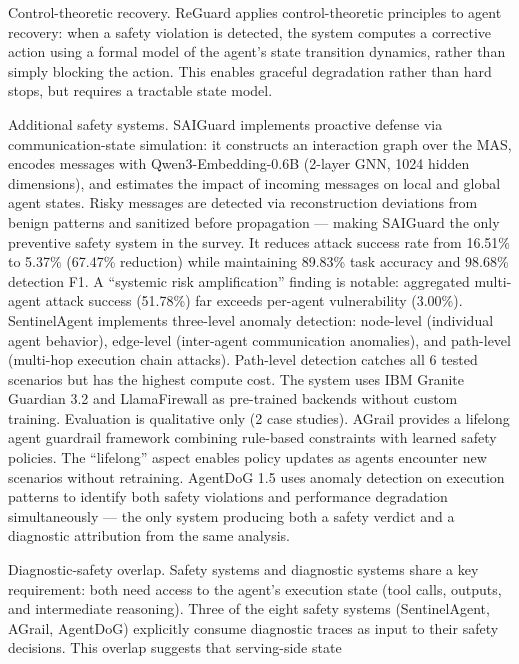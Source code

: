 \documentclass[preprint,12pt]{elsarticle}
\begin{document}
Control-theoretic recovery. ReGuard \cite{v5ref29} applies control-theoretic principles to agent recovery: when a safety violation is detected, the system computes a corrective action using a formal model of the agent's state transition dynamics, rather than simply blocking the action. This enables graceful degradation rather than hard stops, but requires a tractable state model.


Additional safety systems. SAIGuard \cite{v5ref34} implements proactive defense via communication-state simulation: it constructs an interaction graph over the MAS, encodes messages with Qwen3-Embedding-0.6B (2-layer GNN, 1024 hidden dimensions), and estimates the impact of incoming messages on local and global agent states. Risky messages are detected via reconstruction deviations from benign patterns and sanitized before propagation --- making SAIGuard the only preventive safety system in the survey. It reduces attack success rate from 16.51\% to 5.37\% (67.47\% reduction) while maintaining 89.83\% task accuracy and 98.68\% detection F1. A ``systemic risk amplification'' finding is notable: aggregated multi-agent attack success (51.78\%) far exceeds per-agent vulnerability (3.00\%). SentinelAgent \cite{v5ref12} implements three-level anomaly detection: node-level (individual agent behavior), edge-level (inter-agent communication anomalies), and path-level (multi-hop execution chain attacks). Path-level detection catches all 6 tested scenarios but has the highest compute cost. The system uses IBM Granite Guardian 3.2 and LlamaFirewall as pre-trained backends without custom training. Evaluation is qualitative only (2 case studies). AGrail \cite{v5ref21} provides a lifelong agent guardrail framework combining rule-based constraints with learned safety policies. The ``lifelong'' aspect enables policy updates as agents encounter new scenarios without retraining. AgentDoG 1.5 \cite{v5ref18} uses anomaly detection on execution patterns to identify both safety violations and performance degradation simultaneously --- the only system producing both a safety verdict and a diagnostic attribution from the same analysis.


Diagnostic-safety overlap. Safety systems and diagnostic systems share a key requirement: both need access to the agent's execution state (tool calls, outputs, and intermediate reasoning). Three of the eight safety systems (SentinelAgent, AGrail, AgentDoG) explicitly consume diagnostic traces as input to their safety decisions. This overlap suggests that serving-side state
\end{document}
